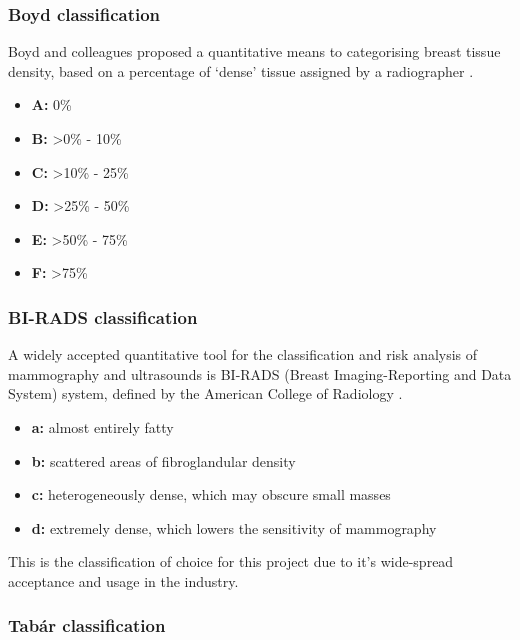 \subsubsection{Boyd classification}

Boyd and colleagues proposed a quantitative means to categorising breast tissue density, based on a percentage of `dense' tissue assigned by a radiographer \cite{Boyd_Byng_Jong_Fishell_Little_Miller_Lockwood_Tritchler_Yaffe_1995}.

\begin{itemize}
  \item \textbf{A: } 0\%
  \item \textbf{B: } \textgreater 0\% - 10\%
  \item \textbf{C: } \textgreater 10\% - 25\%
  \item \textbf{D: } \textgreater 25\% - 50\%
  \item \textbf{E: } \textgreater 50\% - 75\%
  \item \textbf{F: } \textgreater 75\%
\end{itemize}

\subsubsection{BI-RADS classification}

A widely accepted quantitative tool for the classification and risk analysis of mammography and ultrasounds is BI-RADS (Breast Imaging-Reporting and Data System) system, defined by the American College of Radiology \cite{sickles2013acr}.

\begin{itemize}
  \item \textbf{a: } almost entirely fatty
  \item \textbf{b: } scattered areas of fibroglandular density
  \item \textbf{c: } heterogeneously dense, which may obscure small masses
  \item \textbf{d: } extremely dense, which lowers the sensitivity of mammography
\end{itemize}

This is the classification of choice for this project due to it's wide-spread acceptance and usage in the industry.

\subsubsection{Tab\'ar classification}

